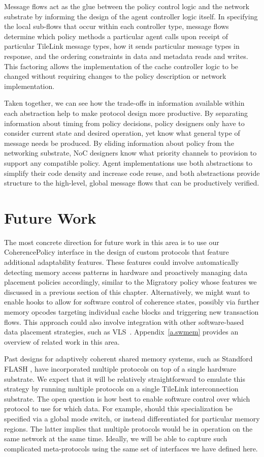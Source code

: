 Message flows act as the glue between the policy control logic and
the network substrate by informing the design of the agent controller logic itself.
In specifying the local sub-flows that occur within each controller type, message flows determine
which policy methods a particular agent calls upon receipt of particular TileLink message types,
how it sends particular message types in response,
and the ordering constraints in data and metadata reads and writes.
This factoring allows the implementation of the cache controller logic
to be changed without requiring changes to the policy description or network implementation.

Taken together, we can see how the trade-offs in information available within each abstraction
help to make protocol design more productive.
By separating information about timing from policy decisions, policy designers only have to consider
current state and desired operation, yet know what general type of message needs be produced.
By eliding information about policy from the networking substrate, NoC designers know what priority channels to provision
to support any compatible policy.
Agent implementations use both abstractions to simplify their code density and increase code reuse, and
both abstractions provide structure to the high-level, global message flows that can be productively verified.

\section{Future Work}

The most concrete direction for future work in this area is to use our CoherencePolicy interface
in the design of custom protocols that feature additional adaptability features.
These features could involve automatically detecting memory access patterns in hardware
and proactively managing data placement policies accordingly, similar to 
the Migratory policy whose features we discussed in a previous section of this chapter.
Alternatively, we might want to enable hooks to allow for software control of coherence states,
possibly via further memory opcodes targeting individual cache blocks and triggering new transaction flows.
This approach could also involve integration with other software-based data placement strategies, such as VLS~\cite{Cook:EECS-2009-131}.
Appendix~\ref{a.swmem} provides an overview of related work in this area.

Past designs for adaptively coherent shared memory systems, such as Standford FLASH \cite{kuskin-archnews94}, 
have incorporated multiple protocols on top of a single hardware substrate. 
We expect that it will be relatively straightforward  to emulate this strategy by
running multiple protocols on a single TileLink interconnection substrate.
The open question is how best to enable software control over which protocol to use for which data.
For example, should this specialization be specified via a global mode switch, or instead
differentiated for particular memory regions.
The latter implies that multiple protocols would be in operation on the same network at the same time.
Ideally, we will be able to capture such complicated meta-protocols using the same set of interfaces we have defined here.

